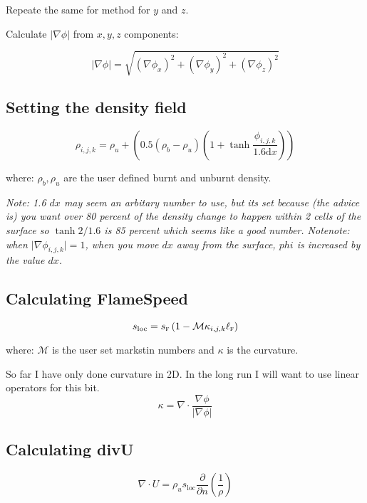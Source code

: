 \documentclass[12pt]{report}
\begin{document}
Repeate the same for method for $y$ and $z$.

Calculate $\lvert \nabla \phi \rvert$ from $x,y,z$ components:

\[\lvert \nabla \phi \rvert = \sqrt{\left(\nabla \phi_x \right)^2 + \left(\nabla \phi_y \right)^2 + \left( \nabla \phi_z \right)^2 }\]

\subsection*{Setting the density field}

\begin{equation}
  \rho_{i,j,k} = \rho_u + \left(0.5 \left(\rho_b - \rho_u \right) \left(1 + \tanh{\frac{\phi_{i,j,k}}{1.6 \text{d}x}}  \right) \right)
  \label{set-rho}
\end{equation}

where: $\rho_b, \rho_u$ are the user defined burnt and unburnt density.

\textit{Note: 1.6 $dx$ may seem an arbitary number to use, but its set because (the advice is) you want over 80 percent of the density change to happen within 2 cells of the surface so $\tanh{2/1.6}$ is 85 percent which seems like a good number. Notenote: when $\lvert \nabla \phi_{i,j,k} \rvert = 1$, when you move $dx$ away from the surface, $phi$ is increased by the value $dx$.}



\subsection*{Calculating FlameSpeed}
\begin{equation}
  s_{\text{loc}} = s_{\textsc{f}} \left(1 - \mathcal{M} \kappa_{i,j,k} \ell_{\textsc{f}} \right)
  \label{calc-flamespeed}
\end{equation}

where: $\mathcal{M}$ is the user set markstin numbers and $\kappa$ is the curvature.

So far I have only done curvature in 2D. In the long run I will want to use linear operators for this bit.
\begin{equation}
  \kappa = \nabla \cdot \frac{\nabla \phi}{\lvert \nabla \phi \rvert}
  \label{calc-kappa}
\end{equation}


\subsection*{Calculating divU}
\begin{equation}
  \nabla \cdot U = \rho_u s_{\text{loc}} \frac{\partial}{\partial n} \left(\frac{1}{\rho}\right)
  \label{calc-divU}
\end{equation}
\end{document}
